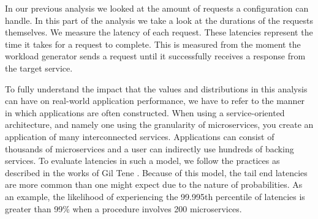 In our previous analysis we looked at the amount of requests a configuration can handle. In this part of the analysis we take a look at the durations of the requests themselves. We measure the latency of each request. These latencies represent the time it takes for a request to complete. This is measured from the moment the workload generator sends a request until it successfully receives a response from the target service.

To fully understand the impact that the values and distributions in this analysis can have on real-world application performance, we have to refer to the manner in which applications are often constructed. When using a service-oriented architecture, and namely one using the granularity of microservices, you create an application of many interconnected services. Applications can consist of thousands of microservices \cite{design-example-microservices, netflix-microservices-cost} and a user can indirectly use hundreds of backing services. To evaluate latencies in such a model, we follow the practices as described in the works of Gil Tene \cite{Tene2015-measure-latency}. Because of this model, the tail end latencies are more common than one might expect due to the nature of probabilities. As an example, the likelihood of experiencing the 99.995th percentile of latencies is greater than 99\% when a procedure involves 200 microservices.

